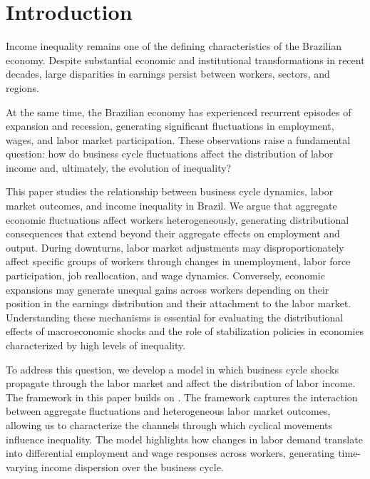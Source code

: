 \documentclass[12pt]{article}
\newcommand{\citeonline}[1]{\citet{#1}}
\begin{document}
	\doublespacing
	
	
	\section{Introduction} \label{sec:introduction}
	
	
	Income inequality remains one of the defining characteristics of the Brazilian economy. Despite substantial economic and institutional transformations in recent decades, large disparities in earnings persist between workers, sectors, and regions. 
	
	
	At the same time, the Brazilian economy has experienced recurrent episodes of expansion and recession, generating significant fluctuations in employment, wages, and labor market participation. These observations raise a fundamental question: how do business cycle fluctuations affect the distribution of labor income and, ultimately, the evolution of inequality?
	
	This paper studies the relationship between business cycle dynamics, labor market outcomes, and income inequality in Brazil. We argue that aggregate economic fluctuations affect workers heterogeneously, generating distributional consequences that extend beyond their aggregate effects on employment and output. During downturns, labor market adjustments may disproportionately affect specific groups of workers through changes in unemployment, labor force participation, job reallocation, and wage dynamics. Conversely, economic expansions may generate unequal gains across workers depending on their position in the earnings distribution and their attachment to the labor market. Understanding these mechanisms is essential for evaluating the distributional effects of macroeconomic shocks and the role of stabilization policies in economies characterized by high levels of inequality.
	
	To address this question, we develop a model in which business cycle shocks propagate through the labor market and affect the distribution of labor income. The framework in this paper builds on
	\citeonline{heathcote2020rise}. The framework captures the interaction between aggregate fluctuations and heterogeneous labor market outcomes, allowing us to characterize the channels through which cyclical movements influence inequality. The model highlights how changes in labor demand translate into differential employment and wage responses across workers, generating time-varying income dispersion over the business cycle.
	
\end{document}
